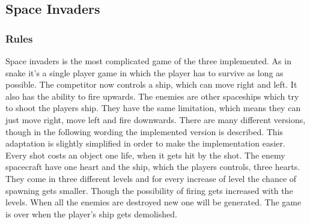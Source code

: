 \documentclass[12pt]{article}
\begin{document}
\subsection{Space Invaders}
\subsubsection{Rules}
Space invaders is the most complicated game of the three implemented. As in snake it's a single player game in which the player has to survive as long as possible. The competitor now controls a ship, which can move right and left. It also has the ability to fire upwards. The enemies are other spaceships which try to shoot the players ship. They have the same limitation, which means they can just move right, move left and fire downwards. There are many different versions, though in the following wording the implemented version is described. This adaptation is slightly simplified in order to make the implementation easier. Every shot costs an object one life, when it gets hit by the shot. The enemy spacecraft have one heart and the ship, which the players controls, three hearts. They come in three different levels and for every increase of level the chance of spawning gets smaller. Though the possibility of firing gets increased with the levels. When all the enemies are destroyed new one will be generated. The game is over when the player's ship gets demolished.
\end{document}
